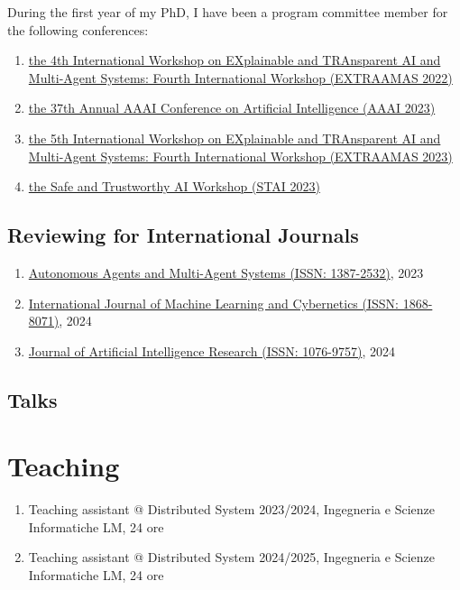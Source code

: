 \documentclass[11pt]{article}
\begin{document}
During the first year of my PhD, I have been a program committee member for the following conferences:

\begin{enumerate}
	\item \href{https://extraamas.ehealth.hevs.ch/archive.html#organizations-2022}{the 4th International Workshop on EXplainable and TRAnsparent AI and Multi-Agent Systems: Fourth International Workshop (EXTRAAMAS 2022)}
	\item \href{https://apice.unibo.it/xwiki/bin/view/Event/Aaai2023}{the 37th Annual AAAI Conference on Artificial Intelligence (AAAI 2023)}
	\item \href{https://apice.unibo.it/xwiki/bin/view/Event/Prima2023}{the 5th International Workshop on EXplainable and TRAnsparent AI and Multi-Agent Systems: Fourth International Workshop (EXTRAAMAS 2023)}
	\item \href{https://web.archive.org/web/20240225110652/https://www.stai.uk/stai-23-iclp}{the Safe and Trustworthy AI Workshop (STAI 2023)}
	\end{enumerate}

\subsection{Reviewing for International Journals}\label{subsec:reviewing-for-international-journals}

\begin{enumerate}
	\item \href{https://link.springer.com/journal/10458}{Autonomous Agents and Multi-Agent Systems (ISSN: 1387-2532)}, 2023
	\item \href{https://link.springer.com/journal/13042}{International Journal of Machine Learning and Cybernetics (ISSN: 1868-8071)}, 2024
	\item \href{https://www.jair.org/index.php/jair/index}{Journal of Artificial Intelligence Research (ISSN: 1076-9757)}, 2024
\end{enumerate}


\subsection{Talks}\label{subsec:talks}


\section{Teaching}\label{sec:teaching}
\begin{enumerate}
	\item Teaching assistant @ Distributed System 2023/2024, Ingegneria e Scienze Informatiche LM, 24 ore
	\item Teaching assistant @ Distributed System 2024/2025, Ingegneria e Scienze Informatiche LM, 24 ore
\end{enumerate}
\end{document}

